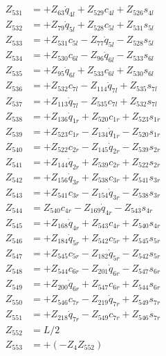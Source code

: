 \begin{multicols}{2}
\begin{align}
Z_{531} &=  + Z_{63}\dot{q}_{4l} + Z_{529}c_{4l} + Z_{526}s_{4l} \nonumber \\
Z_{532} &= + Z_{79}\dot{q}_{5l} + Z_{528}c_{5l} + Z_{531}s_{5l} \nonumber \\
Z_{533} &= + Z_{531}c_{5l} - Z_{77}\dot{q}_{5l} - Z_{528}s_{5l} \nonumber \\
Z_{534} &= + Z_{530}c_{6l} - Z_{96}\dot{q}_{6l} - Z_{533}s_{6l} \nonumber \\
Z_{535} &= + Z_{95}\dot{q}_{6l} + Z_{533}c_{6l} + Z_{530}s_{6l} \nonumber \\
Z_{536} &= + Z_{532}c_{7l} - Z_{114}\dot{q}_{7l} + Z_{535}s_{7l} \nonumber \\
Z_{537} &= + Z_{113}\dot{q}_{7l} - Z_{535}c_{7l} + Z_{532}s_{7l} \nonumber \\
Z_{538} &=   + Z_{136}\dot{q}_{1r} + Z_{520}c_{1r} + Z_{523}s_{1r} \nonumber \\
Z_{539} &=   + Z_{523}c_{1r} - Z_{134}\dot{q}_{1r} - Z_{520}s_{1r} \nonumber \\
Z_{540} &= + Z_{522}c_{2r} - Z_{145}\dot{q}_{2r} - Z_{539}s_{2r} \nonumber \\
Z_{541} &= + Z_{144}\dot{q}_{2r} + Z_{539}c_{2r} + Z_{522}s_{2r} \nonumber \\
Z_{542} &= + Z_{156}\dot{q}_{3r} + Z_{538}c_{3r} + Z_{541}s_{3r} \nonumber \\
Z_{543} &= + Z_{541}c_{3r} - Z_{154}\dot{q}_{3r} - Z_{538}s_{3r} \nonumber \\
Z_{544} &=  Z_{540}c_{4r} - Z_{169}\dot{q}_{4r} - Z_{543}s_{4r} \nonumber \\
Z_{545} &=  + Z_{168}\dot{q}_{4r} + Z_{543}c_{4r} + Z_{540}s_{4r} \nonumber \\
Z_{546} &= + Z_{184}\dot{q}_{5r} + Z_{542}c_{5r} + Z_{545}s_{5r} \nonumber \\
Z_{547} &= + Z_{545}c_{5r} - Z_{182}\dot{q}_{5r} - Z_{542}s_{5r} \nonumber \\
Z_{548} &= + Z_{544}c_{6r} - Z_{201}\dot{q}_{6r} - Z_{547}s_{6r} \nonumber \\
Z_{549} &= + Z_{200}\dot{q}_{6r} + Z_{547}c_{6r} + Z_{544}s_{6r} \nonumber \\
Z_{550} &= + Z_{546}c_{7r} - Z_{219}\dot{q}_{7r} + Z_{549}s_{7r} \nonumber \\
Z_{551} &= + Z_{218}\dot{q}_{7r} - Z_{549}c_{7r} + Z_{546}s_{7r} \nonumber \\
Z_{552} &= L/2 \nonumber \\
Z_{553} &= + (-Z_{4}Z_{552}) \nonumber \\

\end{align}
\end{multicols}
